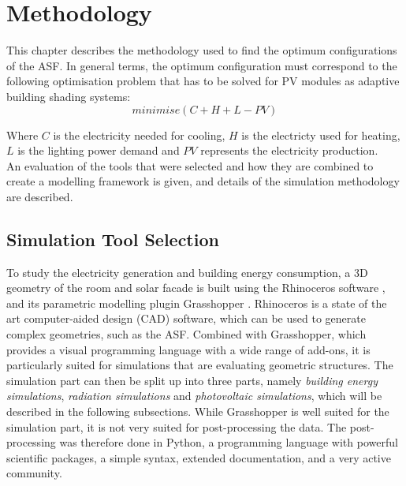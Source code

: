 \chapter{Methodology}
\label{c:methodology}
	


	This chapter describes the methodology used to find the optimum configurations of the ASF. In general terms, the optimum configuration must correspond to the following optimisation problem that has to be solved for PV modules as adaptive building shading systems:\\
	\begin{equation}
			minimise(C+H+L-PV)
	      	\label{e:minimise}
	\end{equation}

	Where $C$ is the electricity needed for cooling, $H$ is the electricty used for heating, $L$ is the lighting power demand and $PV$ represents the electricity production. \\
	An evaluation of the tools that were selected and how they are combined to create a modelling framework is given, and details of the simulation methodology are described.

	\section{Simulation Tool Selection}


		To study the electricity generation and building energy consumption, a 3D geometry of the room and solar facade is built using the Rhinoceros software \cite{Rhino}, and its parametric modelling plugin Grasshopper \cite{grasshopper}. Rhinoceros is a state of the art computer-aided design (CAD) software, which can be used to generate complex geometries, such as the ASF. Combined with Grasshopper, which provides a visual programming language with a wide range of add-ons, it is particularly suited for simulations that are evaluating geometric structures. The simulation part can then be split up into three parts, namely \emph{building energy simulations}, \emph{radiation simulations} and \emph{photovoltaic simulations}, which will be described in the following subsections. While Grasshopper is well suited for the simulation part, it is not very suited for post-processing the data. The post-processing was therefore done in Python, a programming language with powerful scientific packages, a simple syntax, extended documentation, and a very active community.  %

